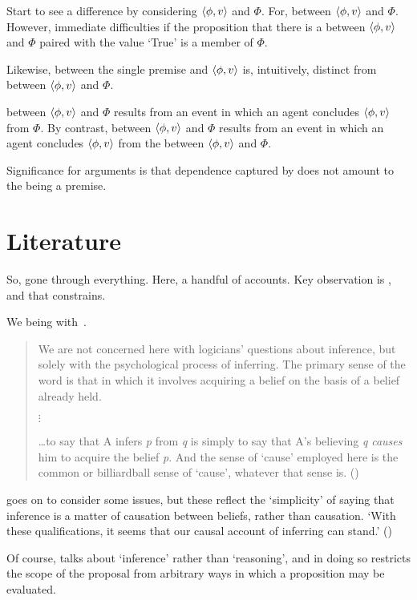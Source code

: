 \begin{note}
  Start to see a difference by considering \(\langle \phi, v \rangle\) and \(\Phi\).
  For, \ros{} between \(\langle \phi, v \rangle\) and \(\Phi\).
  However, immediate difficulties if the proposition that there is a \ros{} between \(\langle \phi, v \rangle\) and \(\Phi\) paired with the value `True' is a member of \(\Phi\).

  Likewise, \ros{} between the single premise and \(\langle \phi, v \rangle\) is, intuitively, distinct from \ros{} between \(\langle \phi, v \rangle\) and \(\Phi\).

  \ros{} between \(\langle \phi, v \rangle\) and \(\Phi\) results from an event in which an agent concludes \(\langle \phi, v \rangle\) from \(\Phi\).
  By contrast, \ros{} between \(\langle \phi, v \rangle\) and \(\Phi\) results from an event in which an agent concludes \(\langle \phi, v \rangle\) from the \ros{} between \(\langle \phi, v \rangle\) and \(\Phi\).
\end{note}

\begin{note}
  Significance for arguments is that dependence captured by \qWhyVnP{} does not amount to the \ros{} being a premise.
\end{note}

\section{Literature}
\label{cha:clar:literature}

\begin{note}
  So, gone through everything.
  Here, a handful of accounts.
  Key observation is \witness{}, and that \witness{} constrains.
\end{note}


\begin{note}
  We being with~\cite{Armstrong:1968vh}.
  \begin{quote}
    We are not concerned here with logicians' questions about inference, but solely with the psychological process of inferring.
    The primary sense of the word is that in which it involves acquiring a belief on the basis of a belief already held.

    \mbox{}\hfill\(\vdots\)\hfill\mbox{}

    \dots to say that A infers \emph{p} from \emph{q} is simply to say that A's believing \emph{q} \emph{causes} him to acquire the belief \emph{p}.
    And the sense of `cause' employed here is the common or billiardball sense of `cause', whatever that sense is.%
    \mbox{}\hfill\mbox{(\citeyear[194]{Armstrong:1968vh})}
  \end{quote}
  \cite{Armstrong:1968vh} goes on to consider some issues, but these reflect the `simplicity' of saying that inference is a matter of causation between beliefs, rather than causation.
  `With these qualifications, it seems that our causal account of inferring can stand.'
  (\citeyear[197]{Armstrong:1968vh})

  Of course, \citeauthor{Armstrong:1968vh} talks about `inference' rather than `reasoning', and in doing so restricts the scope of the proposal from arbitrary ways in which a proposition may be evaluated.
\end{note}

